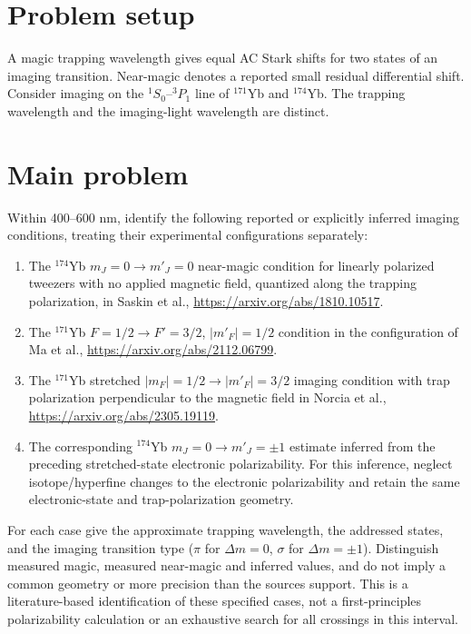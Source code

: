 \documentclass[11pt]{article}
\begin{document}
\section*{Problem setup}
A magic trapping wavelength gives equal AC Stark shifts for two states of
an imaging transition. Near-magic denotes a reported small residual differential
shift. Consider imaging on the $^1S_0$--$^3P_1$ line of $^{171}$Yb and $^{174}$Yb.
The trapping wavelength and the imaging-light wavelength are distinct.
\section*{Main problem}
Within 400--600 nm, identify the following reported or explicitly inferred
imaging conditions, treating their experimental configurations separately:
\begin{enumerate}
\item The $^{174}$Yb $m_J=0\to m'_J=0$ near-magic condition for linearly polarized
tweezers with no applied magnetic field, quantized along the trapping
polarization, in Saskin et al., \url{https://arxiv.org/abs/1810.10517}.
\item The $^{171}$Yb $F=1/2\to F'=3/2$, $|m'_F|=1/2$ condition in the
configuration of Ma et al., \url{https://arxiv.org/abs/2112.06799}.
\item The $^{171}$Yb stretched $|m_F|=1/2\to |m'_F|=3/2$ imaging condition
with trap polarization perpendicular to the magnetic field in Norcia et al.,
\url{https://arxiv.org/abs/2305.19119}.
\item The corresponding $^{174}$Yb $m_J=0\to m'_J=\pm1$ estimate inferred
from the preceding stretched-state electronic polarizability. For this
inference, neglect isotope/hyperfine changes to the electronic polarizability
and retain the same electronic-state and trap-polarization geometry.
\end{enumerate}
For each case give the approximate trapping wavelength, the addressed states,
and the imaging transition type ($\pi$ for $\Delta m=0$, $\sigma$ for
$\Delta m=\pm1$). Distinguish measured magic, measured near-magic and inferred
values, and do not imply a common geometry or more precision than the sources
support. This is a literature-based identification of these specified cases,
not a first-principles polarizability calculation or an exhaustive search for
all crossings in this interval.
\end{document}
